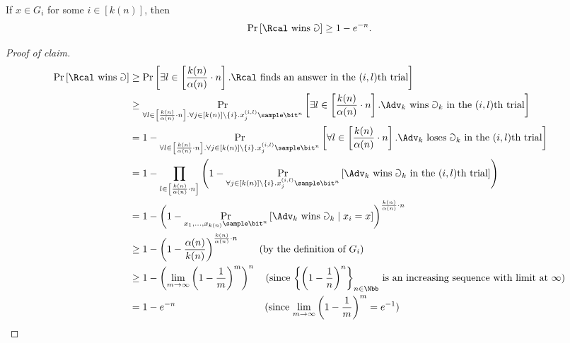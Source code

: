 \begin{answer}[ii]
    \begin{claim}\label{claim:p5-2-1}
        If $x\in G_i$ for some $i\in[k(n)]$, then
        \[
            \Pr\left[ \Rcal \textrm{ wins } \Game   \right] \ge 1-e^{-n}.
        \]
    \end{claim}
    \begin{proof}[Proof of claim]
        \begin{align*}
            \Pr\left[ \Rcal \textrm{ wins } \Game   \right]
            &\ge \Pr\left[ \exists l\in\left[\frac{k(n)}{\alpha(n)}\cdot n\right].
            \Rcal \textrm{ finds an answer in the $(i,l)$th trial}\right] \\
            &\ge  \Pr_{\forall l\in\left[\frac{k(n)}{\alpha(n)}\cdot n\right].\forall j\in[k(n)]\setminus\{i\}. x_j^{(i,l)}\sample\bit^n}
            \left[ \exists l\in\left[\frac{k(n)}{\alpha(n)}\cdot n\right].
            \Adv_k \textrm{ wins } \Game_k \textrm{ in the $(i,l)$th trial}\right] \\
            &=  1- \Pr_{\forall l\in\left[\frac{k(n)}{\alpha(n)}\cdot n\right].\forall j\in[k(n)]\setminus\{i\}. x_j^{(i,l)}\sample\bit^n}
            \left[ \forall l\in\left[\frac{k(n)}{\alpha(n)}\cdot n\right].
            \Adv_k \textrm{ loses } \Game_k \textrm{ in the $(i,l)$th trial}\right] \\
            &=  1- \prod_{l\in\left[\frac{k(n)}{\alpha(n)}\cdot n\right]}\left( 1-
            \Pr_{\forall j\in[k(n)]\setminus\{i\}. x_j^{(i,l)}\sample\bit^n}\left[\Adv_k \textrm{ wins } \Game_k \textrm{ in the $(i,l)$th trial}\right] \right) \\
            &=  1- \left( 1-\Pr_{x_1,\ldots,x_{k(n)}\sample\bit^n}\left[\Adv_k \textrm{ wins } \Game_k \mid x_i = x \right] \right)^{\frac{k(n)}{\alpha(n)}\cdot n} \\
            &\ge 1- \left( 1-\frac{\alpha(n)}{k(n)} \right)^{\frac{k(n)}{\alpha(n)}\cdot n}
            \qquad \textrm{(by the definition of $G_i$)}\\
            &\ge 1- \left(\lim_{m\to\infty}\left( 1-\frac{1}{m} \right)^m \right)^n
            \quad \textrm{(since $\left\{\left(1-\frac{1}{n}\right)^n\right\}_{n\in\Nbb}$ is an increasing sequence with limit at $\infty$)}\\
            &= 1-e^{-n} \qquad\qquad\qquad\qquad\quad \textrm{(since $\lim_{m\to\infty}\left( 1-\frac{1}{m}\right)^m=e^{-1}$)}
        \end{align*}
    \end{proof}


\end{answer}
